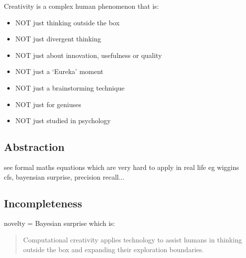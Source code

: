 Creativity is a complex human phenomenon that is:

\begin{itemize}
  \item NOT just thinking outside the box
  \item NOT just divergent thinking
  \item NOT just about innovation, usefulness or quality
  \item NOT just a `Eureka' moment
  \item NOT just a brainstorming technique
  \item NOT just for geniuses
  \item NOT just studied in psychology
\end{itemize}


\subsection{Abstraction}

see formal maths equations which are very hard to apply in real life eg wiggins cfs, bayensian surprise, precision recall...


\subsection{Incompleteness}

\autocite{Varshney2013}
novelty = Bayesian surprise \autocite{Baldi2010}
which is:

\begin{quote}
  Computational creativity applies technology to assist humans in thinking outside the box and expanding their exploration boundaries. 
\end{quote}

%

